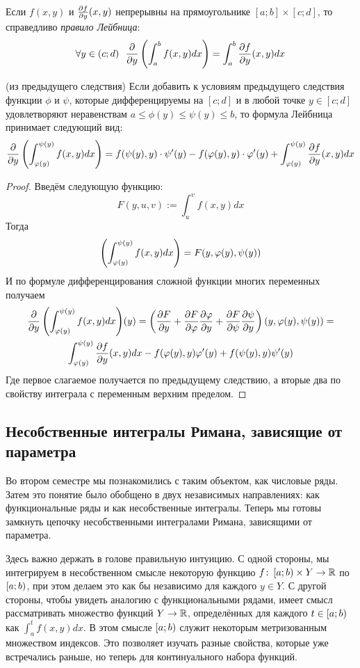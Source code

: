 \begin{corollary}
	Если $f(x, y)$ и $\frac{\partial f}{\partial y}(x, y)$ непрерывны  на прямоугольнике $[a; b] \times [c; d]$, то справедливо \textit{правило Лейбница}:
	\[
		\forall y \in (c; d)\ \ \frac{\partial }{\partial y}\left(\int_a^b f(x, y)dx\right) = \int_a^b \frac{\partial f}{\partial y}(x, y)dx
	\]
\end{corollary}

\begin{corollary} (из предыдущего следствия)
	Если добавить к условиям предыдущего следствия функции $\phi$ и $\psi$, которые дифференцируемы на $[c; d]$ и в любой точке $y \in [c; d]$ удовлетворяют неравенствам $a \le \phi(y) \le \psi(y) \le b$, то формула Лейбница принимает следующий вид:
	\[
		\frac{\partial }{\partial y}\left(\int_{\varphi(y)}^{\psi(y)} f(x, y)dx\right) = f(\psi(y), y) \cdot \psi'(y) - f(\varphi(y), y) \cdot \varphi'(y) + \int_{\varphi(y)}^{\psi(y)} \frac{\partial f}{\partial y}(x, y)dx
	\]
\end{corollary}

\begin{proof}
	Введём следующую функцию:
	\[
		F(y, u, v) := \int_u^v f(x, y) dx
	\]
	Тогда
	\[
		\left(\int_{\varphi(y)}^{\psi(y)} f(x, y)dx\right) = F(y, \varphi(y), \psi(y))
	\]
	И по формуле дифференцирования сложной функции многих переменных получаем
	\begin{multline*}
		\frac{\partial }{\partial y}\left(\int_{\varphi(y)}^{\psi(y)} f(x, y)dx\right)\!(y) = \left(\frac{\partial F}{\partial y} + \frac{\partial F}{\partial \varphi}\frac{\partial \varphi}{\partial y} + \frac{\partial F}{\partial \psi}\frac{\partial \psi}{\partial y}\right)(y, \varphi(y), \psi(y)) = \\
		\int_{\varphi(y)}^{\psi(y)} \frac{\partial f}{\partial y}(x, y)dx -f(\varphi(y), y)\varphi'(y) + f(\psi(y), y)\psi'(y)
	\end{multline*}
	Где первое слагаемое получается по предыдущему следствию, а вторые два по свойству интеграла с переменным верхним пределом.
\end{proof}

\subsection{Несобственные интегралы Римана, зависящие от параметра}

Во втором семестре мы познакомились с таким объектом, как числовые ряды. Затем это понятие было обобщено в двух независимых направлениях: как функциональные ряды и как несобственные интегралы. Теперь мы готовы замкнуть цепочку несобственными интегралами Римана, зависящими от параметра.

Здесь важно держать в голове правильную интуицию. С одной стороны, мы интегрируем в несобственном смысле некоторую функцию $f \colon \left[a; b\right) \times Y \to \mathbb{R}$ по $\left[a; b\right)$, при этом делаем это как бы независимо для каждого $y \in Y$. С другой стороны, чтобы увидеть аналогию с функциональными рядами, имеет смысл рассматривать множество функций $Y \to \mathbb{R}$, определённых для каждого $t \in \left[a; b\right)$ как $\int_a^t f(x, y) dx$. В этом смысле $\left[a; b\right)$ служит некоторым метризованным множеством индексов. Это позволяет изучать разные свойства, которые уже встречались раньше, но теперь для континуального набора функций.

